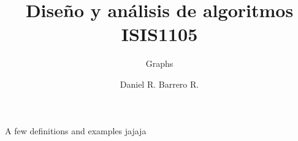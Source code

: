 \documentclass{beamer}
\title{Diseño y análisis de algoritmos\\ ISIS1105}
\subtitle{Graphs}
\author{Daniel R. Barrero R.}
\begin{document}
\frame{\titlepage}

\begin{frame}{A few definitions and examples}
	jajaja
\end{frame}
\end{document}

